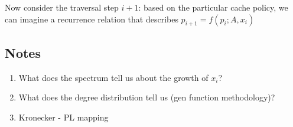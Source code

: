 \documentclass[11pt]{article}
\begin{document}
Now consider the traversal step $i+1$: based on the particular cache policy, we can imagine a recurrence relation that describes $p_{i+1}=f(p_i; A, x_i)$

\subsection{Notes}
\begin{enumerate}
\item What does the spectrum tell us about the growth of $x_i$?
\item What does the degree distribution tell us (gen function methodology)?
\item Kronecker - PL mapping
\end{enumerate}






\end{document}
